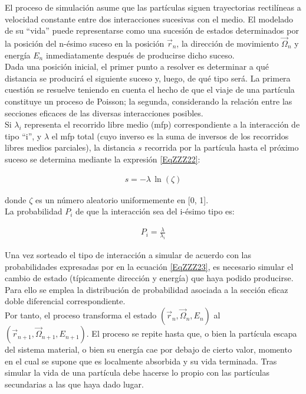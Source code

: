 El proceso de simulaci\'on asume que las part\'iculas siguen trayectorias rectil\'ineas a velocidad constante entre dos interacciones
sucesivas con el medio. El modelado de su ``vida'' puede representarse como una sucesi\'on de estados determinados por la posici\'on del
n-\'esimo suceso en la posici\'on $\vec{r}_{n}$, la direcci\'on de movimiento $\vec{\Omega}_{n}$ y energ\'ia $E_{n}$ inmediatamente
despu\'es de producirse dicho suceso. \\
%
%
Dada una posici\'on inicial, el primer punto a resolver es determinar a qu\'e distancia se producir\'a el siguiente suceso y, luego, de qu\'e
tipo ser\'a.
%
La primera cuesti\'on se resuelve teniendo en cuenta el hecho de que el viaje de una part\'icula constituye un proceso de Poisson; la
segunda, considerando la relaci\'on entre las secciones eficaces de las diversas interacciones posibles. \\
%
%
Si $\lambda_{i}$ representa el recorrido libre medio (mfp) correspondiente a la interacci\'on de tipo ``i'', y $\lambda$ el mfp total (cuyo
inverso es la suma de inversos de los recorridos libres medios parciales), la distancia $s$ recorrida por la part\'icula hasta el pr\'oximo
suceso se determina mediante la expresi\'on \ref{EqZZZ22}:

\begin{eqnarray}
 	s = -\lambda \, \ln (\zeta)
 \label{EqZZZ22}
\end{eqnarray}

donde $\zeta$ es un n\'umero aleatorio uniformemente en [0, 1].  \\
%
%
La probabilidad $P_{i}$ de que la interacci\'on sea del i-\'esimo tipo es:

\begin{eqnarray}
 	P_{i} = \frac{\lambda}{\lambda_{i}}
 \label{EqZZZ23}
\end{eqnarray}

Una vez sorteado el tipo de interacci\'on a simular de acuerdo con las probabilidades expresadas por en la ecuaci\'on \ref{EqZZZ23}, es
necesario simular el cambio de estado (t\'ipicamente direcci\'on y energ\'ia) que haya podido producirse.
%
Para ello se emplea la distribuci\'on de probabilidad asociada a la secci\'on eficaz doble diferencial correspondiente. \\
%
%
Por tanto, el proceso transforma el estado $(\vec{r}_{n}, \vec{\Omega}_{n}, E_{n})$ al $(\vec{r}_{n+1}, \vec{\Omega}_{n+1}, E_{n+1})$.
%
El proceso se repite hasta que, o bien la part\'icula escapa del sistema material, o bien su energ\'ia cae por debajo de cierto valor,
momento en el cual se supone que es localmente absorbida y su vida terminada.
%
Tras simular la vida de una part\'icula debe hacerse lo propio con las part\'iculas secundarias a las que haya dado lugar. \\
%
%
